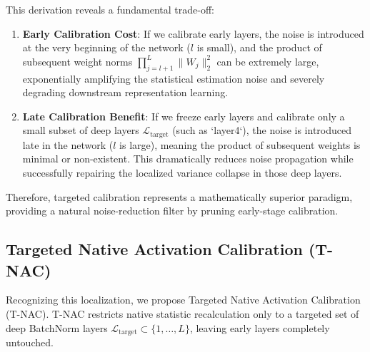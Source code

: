 \documentclass{article}
\theoremstyle{plain}
\theoremstyle{definition}
\begin{document}
This derivation reveals a fundamental trade-off:
\begin{enumerate}\setlength{\itemsep}{0pt}\setlength{\parskip}{0pt}
    \item \textbf{Early Calibration Cost}: If we calibrate early layers, the noise is introduced at the very beginning of the network ($l$ is small), and the product of subsequent weight norms $\prod_{j=l+1}^L \|W_j\|^2_2$ can be extremely large, exponentially amplifying the statistical estimation noise and severely degrading downstream representation learning.
    \item \textbf{Late Calibration Benefit}: If we freeze early layers and calibrate only a small subset of deep layers $\mathcal{L}_{\text{target}}$ (such as `layer4`), the noise is introduced late in the network ($l$ is large), meaning the product of subsequent weights is minimal or non-existent. This dramatically reduces noise propagation while successfully repairing the localized variance collapse in those deep layers.
\end{enumerate}

Therefore, targeted calibration represents a mathematically superior paradigm, providing a natural noise-reduction filter by pruning early-stage calibration.

\subsection{Targeted Native Activation Calibration (T-NAC)}
Recognizing this localization, we propose Targeted Native Activation Calibration (T-NAC). T-NAC restricts native statistic recalculation only to a targeted set of deep BatchNorm layers $\mathcal{L}_{\text{target}} \subset \{1, \dots, L\}$, leaving early layers completely untouched. 
\end{document}
